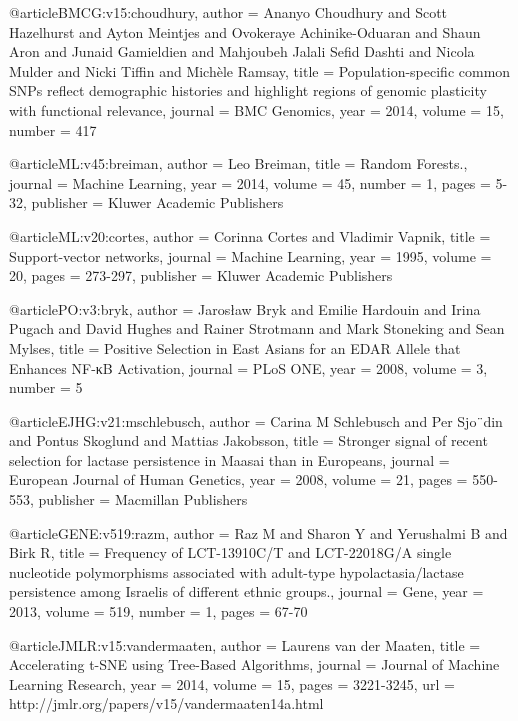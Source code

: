 @article{BMCG:v15:choudhury,
	author    = {Ananyo Choudhury and Scott Hazelhurst and Ayton Meintjes and Ovokeraye Achinike-Oduaran and Shaun Aron and Junaid Gamieldien and Mahjoubeh Jalali Sefid Dashti and Nicola Mulder and Nicki Tiffin and Michèle Ramsay},
	title     = {Population-specific common SNPs reflect demographic histories and highlight regions of genomic plasticity with functional relevance},
	journal   = {BMC Genomics},
	year      = {2014},
	volume    = {15},
	number    = {417}
}

@article{ML:v45:breiman,
	author    = {Leo Breiman},
	title     = {Random Forests.},
	journal   = {Machine Learning},
	year      = {2014},
	volume    = {45},
	number    = {1},
	pages     = {5-32},
	publisher = {Kluwer Academic Publishers}
}

@article{ML:v20:cortes,
	author    = {Corinna Cortes and Vladimir Vapnik},
	title     = {Support-vector networks},
	journal   = {Machine Learning},
	year      = {1995},
	volume    = {20},
	pages     = {273-297},
	publisher = {Kluwer Academic Publishers}
}

@article{PO:v3:bryk,
	author    = {Jarosław Bryk and Emilie Hardouin and Irina Pugach and David Hughes and Rainer Strotmann and Mark Stoneking and Sean Mylses},
	title     = {Positive Selection in East Asians for an EDAR Allele that Enhances NF-κB Activation},
	journal   = {PLoS ONE},
	year      = {2008},
	volume    = {3},
	number    = {5}
}

@article{EJHG:v21:mschlebusch,
	author    = {Carina M Schlebusch and Per Sjo¨din and Pontus Skoglund and Mattias Jakobsson},
	title     = {Stronger signal of recent selection for lactase persistence in Maasai than in Europeans},
	journal   = {European Journal of Human Genetics},
	year      = {2008},
	volume    = {21},
	pages     = {550-553},
	publisher = {Macmillan Publishers}
}

@article{GENE:v519:razm,
	author    = {Raz M and Sharon Y and Yerushalmi B and Birk R},
	title     = {Frequency of LCT-13910C/T and LCT-22018G/A single nucleotide polymorphisms associated with adult-type hypolactasia/lactase persistence among Israelis of different ethnic groups.},
	journal   = {Gene},
	year      = {2013},
	volume    = {519},
	number    = {1},
	pages     = {67-70}
}

@article{JMLR:v15:vandermaaten,
	author    = {Laurens van der Maaten},
	title     = {Accelerating t-SNE using Tree-Based Algorithms},
	journal   = {Journal of Machine Learning Research},
	year      = {2014},
	volume    = {15},
	pages     = {3221-3245},
	url       = {http://jmlr.org/papers/v15/vandermaaten14a.html}
}

